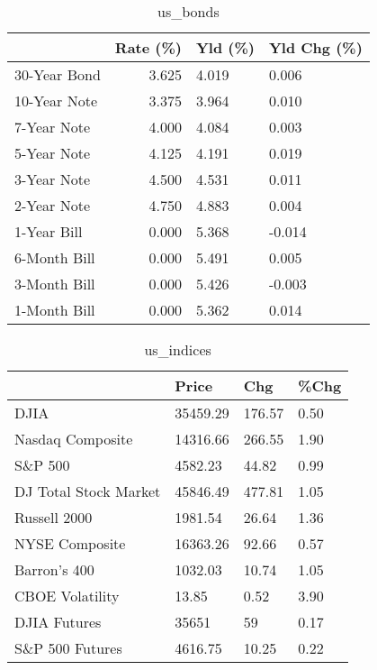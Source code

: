 \documentclass{article}%
\begin{document}
\begin{table}[htbp]%
\caption{us\_bonds}%
\centering%
\begin{adjustbox}{width=1\textwidth}%
\begin{tabular}{lrll}
\toprule
             &  Rate (\%) & Yld (\%) & Yld Chg (\%) \\
\midrule
30-Year Bond &     3.625 &   4.019 &       0.006 \\
10-Year Note &     3.375 &   3.964 &       0.010 \\
 7-Year Note &     4.000 &   4.084 &       0.003 \\
 5-Year Note &     4.125 &   4.191 &       0.019 \\
 3-Year Note &     4.500 &   4.531 &       0.011 \\
 2-Year Note &     4.750 &   4.883 &       0.004 \\
 1-Year Bill &     0.000 &   5.368 &      -0.014 \\
6-Month Bill &     0.000 &   5.491 &       0.005 \\
3-Month Bill &     0.000 &   5.426 &      -0.003 \\
1-Month Bill &     0.000 &   5.362 &       0.014 \\
\bottomrule
\end{tabular}
%
\end{adjustbox}%
\end{table}

%


\begin{table}[htbp]%
\caption{us\_indices}%
\centering%
\begin{adjustbox}{width=1\textwidth}%
\begin{tabular}{llll}
\toprule
                      &    Price &    Chg & \%Chg \\
\midrule
                 DJIA & 35459.29 & 176.57 & 0.50 \\
     Nasdaq Composite & 14316.66 & 266.55 & 1.90 \\
              S\&P 500 &  4582.23 &  44.82 & 0.99 \\
DJ Total Stock Market & 45846.49 & 477.81 & 1.05 \\
         Russell 2000 &  1981.54 &  26.64 & 1.36 \\
       NYSE Composite & 16363.26 &  92.66 & 0.57 \\
         Barron's 400 &  1032.03 &  10.74 & 1.05 \\
      CBOE Volatility &    13.85 &   0.52 & 3.90 \\
         DJIA Futures &    35651 &     59 & 0.17 \\
      S\&P 500 Futures &  4616.75 &  10.25 & 0.22 \\
\bottomrule
\end{tabular}
%
\end{adjustbox}%
\end{table}
\end{document}
